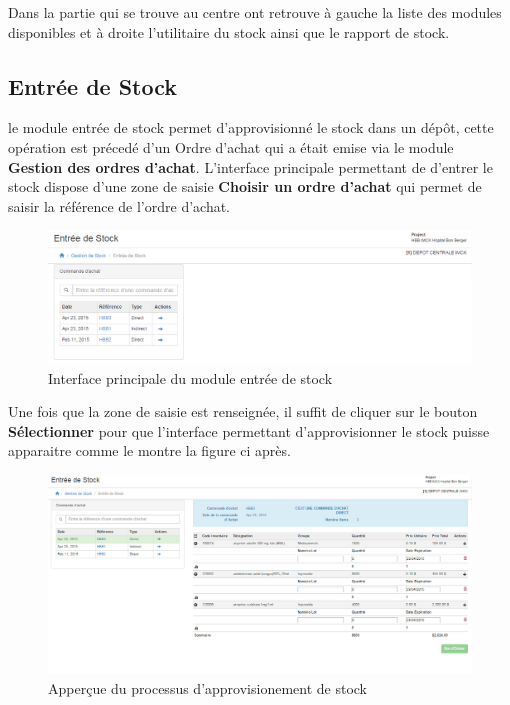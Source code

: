 \documentclass[12pt,a4paper]{report}
\begin{document}
Dans la partie qui se trouve au centre ont retrouve à gauche la liste des modules disponibles et à droite l'utilitaire du stock ainsi que le rapport de stock.


\subsection{Entrée de Stock}
le module entrée de stock permet d'approvisionné le stock dans un dépôt, cette opération est précedé d'un Ordre d'achat qui a était emise via le module \textbf{Gestion des ordres d'achat}. L'interface principale permettant de d'entrer le stock dispose d'une zone de saisie \textbf{Choisir un ordre d'achat} qui permet de saisir la référence de l'ordre d'achat.

\begin{figure}[h]
\begin{center}
\includegraphics[width=12cm]{pic/EntreStock.png}
\end{center}
\caption{Interface principale du module entrée de stock}
\label{Interface principale du module entrée de stock}
\end{figure}

Une fois que la zone de saisie est renseignée, il suffit de cliquer sur le bouton \textbf{Sélectionner} pour que l'interface permettant d'approvisionner le stock puisse apparaitre comme le montre la figure ci après.

\begin{figure}[h]
\begin{center}
\includegraphics[width=14cm]{pic/EntreStockForm.png}
\end{center}
\caption{Apperçue du processus d'approvisionement de stock}
\label{Apperçue du processus d'approvisionement de stock}
\end{figure}
\end{document}

